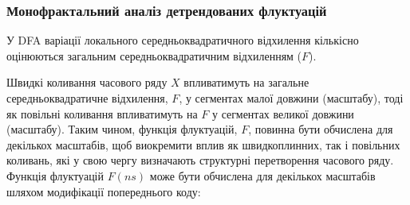 \documentclass[
  letterpaper,
]{report}
\begin{document}
\hypertarget{ux43cux43eux43dux43eux444ux440ux430ux43aux442ux430ux43bux44cux43dux438ux439-ux430ux43dux430ux43bux456ux437-ux434ux435ux442ux440ux435ux43dux434ux43eux432ux430ux43dux438ux445-ux444ux43bux443ux43aux442ux443ux430ux446ux456ux439}{%
\subsubsection{Монофрактальний аналіз детрендованих
флуктуацій}\label{ux43cux43eux43dux43eux444ux440ux430ux43aux442ux430ux43bux44cux43dux438ux439-ux430ux43dux430ux43bux456ux437-ux434ux435ux442ux440ux435ux43dux434ux43eux432ux430ux43dux438ux445-ux444ux43bux443ux43aux442ux443ux430ux446ux456ux439}}

У DFA варіації локального середньоквадратичного відхилення кількісно
оцінюються загальним середньоквадратичним відхиленням (\(F\)).

Швидкі коливання часового ряду \(X\) впливатимуть на загальне
середньоквадратичне відхилення, \(F\), у сегментах малої довжини
(масштабу), тоді як повільні коливання впливатимуть на \(F\) у сегментах
великої довжини (масштабу). Таким чином, функція флуктуацій, \(F\),
повинна бути обчислена для декількох масштабів, щоб виокремити вплив як
швидкоплинних, так і повільних коливань, які у свою чергу визначають
структурні перетворення часового ряду. Функція флуктуацій \(F(ns)\) може
бути обчислена для декількох масштабів шляхом модифікації попереднього
коду:
\end{document}
